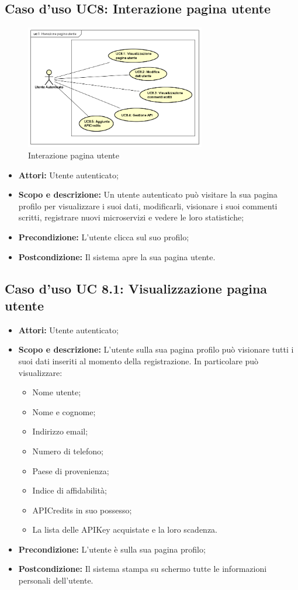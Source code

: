 \documentclass[12pt,a4paper,titlepage]{article}
\begin{document}
	\subsection{Caso d'uso UC8: Interazione pagina utente}
	\label{UC8}
	\begin{figure}[H]
		\centering
		\includegraphics[width=0.7\textwidth]{UseCase/InterazionePaginaUtente}
		\caption{Interazione pagina utente}
	\end{figure}
	\begin{itemize}
		\item \textbf{Attori: }Utente autenticato;
		\item \textbf{Scopo e descrizione: }Un utente autenticato può visitare la sua pagina profilo per visualizzare i suoi dati, modificarli, visionare i suoi commenti scritti, registrare nuovi microservizi e vedere le loro statistiche;
		\item \textbf{Precondizione: }L'utente clicca sul suo profilo;
		\item \textbf{Postcondizione: }Il sistema apre la sua pagina utente.
	\end{itemize}
	\subsection{Caso d'uso UC 8.1: Visualizzazione pagina utente}
	\label{UC8.1}
	\begin{itemize}
		\item \textbf{Attori: }Utente autenticato;
		\item \textbf{Scopo e descrizione: }L'utente sulla sua pagina profilo può visionare tutti i suoi dati inseriti al momento della registrazione. In particolare può visualizzare:
		\begin{itemize}
			\item Nome utente;
			\item Nome e cognome;
			\item Indirizzo email;
			\item Numero di telefono;
			\item Paese di provenienza;
			\item Indice di affidabilità;
			\item APICredits in suo possesso;
			\item La lista delle APIKey acquistate e la loro scadenza.
		\end{itemize}
		\item \textbf{Precondizione: }L'utente è sulla sua pagina profilo;
		\item \textbf{Postcondizione: }Il sistema stampa su schermo tutte le informazioni personali dell'utente.
	\end{itemize}
\end{document}
